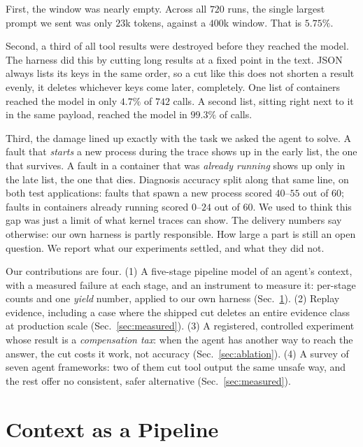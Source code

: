 \documentclass[10pt,conference]{IEEEtran}
\begin{document}
First, the window was nearly empty. Across all $720$ runs, the single
largest prompt we sent was only $23$k tokens, against a $400$k window.
That is $5.75\%$.

Second, a third of all tool results were destroyed before they reached
the model. The harness did this by cutting long results at a fixed point
in the text. JSON always lists its keys in the same order, so a cut like
this does not shorten a result evenly, it deletes whichever keys come
later, completely. One list of containers reached the model in only
$4.7\%$ of $742$ calls. A second list, sitting right next to it in the
same payload, reached the model in $99.3\%$ of calls.

Third, the damage lined up exactly with the task we asked the agent to
solve. A fault that \emph{starts} a new process during the trace shows up
in the early list, the one that survives. A fault in a container that was
\emph{already running} shows up only in the late list, the one that dies.
Diagnosis accuracy split along that same line, on both test applications:
faults that spawn a new process scored $40$--$55$ out of $60$; faults in
containers already running scored $0$--$24$ out of $60$. We used to think
this gap was just a limit of what kernel traces can show. The delivery
numbers say otherwise: our own harness is partly responsible. How large a
part is still an open question. We report what our experiments settled,
and what they did not.

Our contributions are four. (1) A five-stage pipeline model of an agent's
context, with a measured failure at each stage, and an instrument to
measure it: per-stage counts and one \emph{yield} number, applied to our
own harness (Sec.~\ref{sec:pipeline}). (2) Replay evidence, including a
case where the shipped cut deletes an entire evidence class at
production scale (Sec.~\ref{sec:measured}). (3) A registered, controlled
experiment whose result is a \emph{compensation tax}: when the agent has
another way to reach the answer, the cut costs it work, not accuracy
(Sec.~\ref{sec:ablation}). (4) A survey of seven agent frameworks: two of
them cut tool output the same unsafe way, and the rest offer no
consistent, safer alternative (Sec.~\ref{sec:measured}).

\section{Context as a Pipeline}
\label{sec:pipeline}
\end{document}
